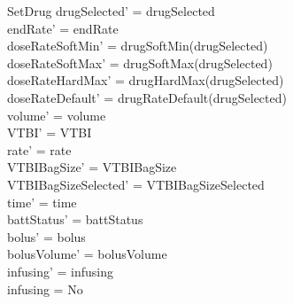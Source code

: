 \begin{schema}{SetDrug}
	drugSelected' = drugSelected\\
	endRate' = endRate\\
	doseRateSoftMin' = drugSoftMin(drugSelected)\\
	doseRateSoftMax' = drugSoftMax(drugSelected)\\
	doseRateHardMax' = drugHardMax(drugSelected)\\
	doseRateDefault' = drugRateDefault(drugSelected)\\
	volume' = volume\\
	VTBI' = VTBI\\
	rate' = rate\\
	VTBIBagSize' = VTBIBagSize\\ 
	VTBIBagSizeSelected' = VTBIBagSizeSelected\\
	time' = time\\
	battStatus' = battStatus\\
	bolus' = bolus\\
	bolusVolume' = bolusVolume\\
	infusing' = infusing\\
	infusing = No\\

\end{schema}
